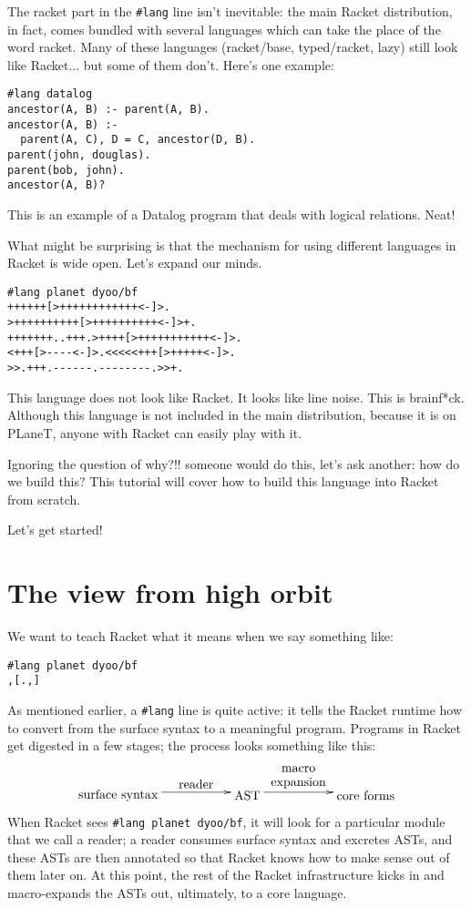 \documentclass{article}
\begin{document}
The racket part in the \verb+#lang+ line isn't inevitable: the main Racket distribution, in fact, comes bundled with several languages which can take the place of the word racket. Many of these languages (racket/base, typed/racket, lazy) still look like Racket... but some of them don't. Here's one example:
\begin{verbatim}
#lang datalog
ancestor(A, B) :- parent(A, B).
ancestor(A, B) :-
  parent(A, C), D = C, ancestor(D, B).
parent(john, douglas).
parent(bob, john).
ancestor(A, B)?
\end{verbatim}
This is an example of a Datalog program that deals with logical relations. Neat!


What might be surprising is that the mechanism for using different languages in Racket is wide open. Let's expand our minds.
\begin{verbatim}
#lang planet dyoo/bf
++++++[>++++++++++++<-]>.
>++++++++++[>++++++++++<-]>+.
+++++++..+++.>++++[>+++++++++++<-]>.
<+++[>----<-]>.<<<<<+++[>+++++<-]>.
>>.+++.------.--------.>>+.
\end{verbatim}
This language does not look like Racket. It looks like line noise. This is brainf*ck. Although this language is not included in the main distribution, because it is on PLaneT, anyone with Racket can easily play with it.


Ignoring the question of why?!! someone would do this, let's ask another: how do we build this? This tutorial will cover how to build this language into Racket from scratch.

Let's get started!

\section{The view from high orbit}
We want to teach Racket what it means when we say something like:
\begin{verbatim}
#lang planet dyoo/bf
,[.,]
\end{verbatim}
As mentioned earlier, a \verb+#lang+ line is quite active: it tells the Racket runtime how to convert from the surface syntax to a meaningful program. Programs in Racket get digested in a few stages; the process looks something like this:
%
\begin{displaymath}
\xymatrix {
    \txt{surface syntax} \ar[rr]^-{\txt{reader}}  & &\txt{AST} \ar[rr]^-{\txt{macro\\expansion}} & & \txt{core forms}}
\end{displaymath}
%
When Racket sees \verb+#lang planet dyoo/bf+, it will look for a particular module that we call a reader; a reader consumes surface syntax and excretes ASTs, and these ASTs are then annotated so that Racket knows how to make sense out of them later on. At this point, the rest of the Racket infrastructure kicks in and macro-expands the ASTs out, ultimately, to a core language.
\end{document}
